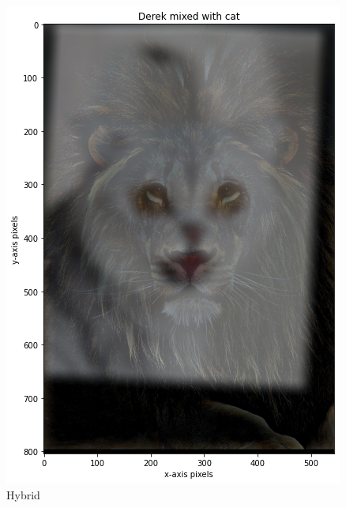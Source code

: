 \documentclass{article}
\begin{document}
\begin{figure}[!htb]
    \includegraphics[width=\linewidth]{lioncat.png}
    \caption{Hybrid}\label{fig:awesome_image2}
\endminipage
\end{figure}
\end{document}
